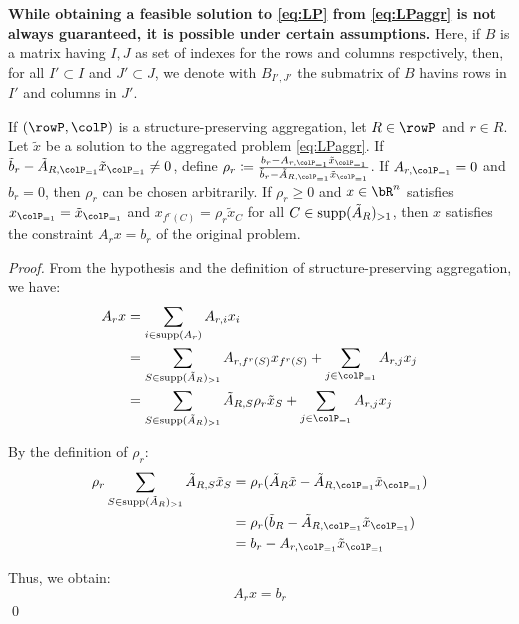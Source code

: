 {
\color{gray}
\textbf{While obtaining a feasible solution to \eqref{eq:LP} from \eqref{eq:LPaggr} is not always guaranteed, it is possible under certain assumptions.}
Here, if \(B\) is a matrix having \(I,J\) as set of indexes for the rows and columns respctively, then, for all \(I' \subset I\) and \(J' \subset J\), we denote with \(B_{I',J'}\) the submatrix of \(B\) havins rows in \(I'\) and columns in \(J'\).
\begin{observation}
\label{ob:aggrconstr}
If \((\rowP, \colP)\) is a structure-preserving aggregation, let \(R \in \rowP\) and \(r \in R\). Let \(\tilde{x}\) be a solution to the aggregated problem \eqref{eq:LPaggr}. If \(\tilde{b}_r - \tilde{A}_{R, \colP_{=1}} \tilde{x}_{\colP_{=1}} \neq 0\), define \(\rho_r \coloneqq \frac{b_r - A_{r, \colP_{=1}} \tilde{x}_{\colP_{=1}}}{\tilde{b}_r
 - \tilde{A}_{R, \colP_{=1}} \tilde{x}_{\colP_{=1}}}\). If \(A_{r, \colP_{=1}} = 0\) and \(b_r = 0\), then \(\rho_r\) can be chosen arbitrarily. 
If \(\rho_r \geq 0\) and \(x \in \bR^n\) satisfies \(x_{\colP_{=1}} = \tilde{x}_{\colP_{=1}}\) and \(x_{f^r(C)} = \rho_r \tilde{x}_C\) for all \(C \in \operatorname{supp}(\tilde{A}_R)_{>1}\), then \(x\) satisfies the constraint \(A_r x = b_r\) of the original problem.
\end{observation}

\begin{proof}
From the hypothesis and the definition of structure-preserving aggregation, we have:
\begin{align*}
A_r x &= \sum_{i \in \supp(A_r)} A_{r,i} x_i \\
&= \sum_{S \in \supp(\tilde{A}_R)_{>1}} A_{r,f^r(S)} x_{f^r(S)} + 
\sum_{j \in \colP_{=1}} A_{r,j} x_j \\
&= \sum_{S \in \supp(\tilde{A}_R)_{>1}} \tilde{A}_{R,S} \rho_r \tilde{x}_S + 
\sum_{j \in \colP_{=1}} A_{r,j} x_j
\end{align*}

By the definition of \(\rho_r\):
\begin{align*}
\rho_r \sum_{S \in \supp(\tilde{A}_R)_{>1}} \tilde{A}_{R,S} \tilde{x}_S 
&= \rho_r (\tilde{A}_R \tilde{x} - \tilde{A}_{R,\colP_{=1}} \tilde{x}_{\colP_{=1}}) \\
&= \rho_r (\tilde{b}_R - \tilde{A}_{R,\colP_{=1}} \tilde{x}_{\colP_{=1}}) \\
&= b_r - A_{r, \colP_{=1}} \tilde{x}_{\colP_{=1}}
\end{align*}

Thus, we obtain:
\[
A_r x = b_r
\]
\qed
\end{proof}

}
